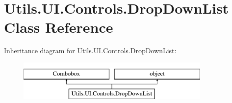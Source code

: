 \hypertarget{class_c_utils_1_1_utils_1_1_u_i_1_1_controls_1_1_drop_down_list}{}\section{Utils.\+U\+I.\+Controls.\+Drop\+Down\+List Class Reference}
\label{class_c_utils_1_1_utils_1_1_u_i_1_1_controls_1_1_drop_down_list}
Inheritance diagram for Utils.\+U\+I.\+Controls.\+Drop\+Down\+List\+:\begin{figure}[H]
\begin{center}
\leavevmode
\includegraphics[height=2.000000cm]{class_c_utils_1_1_utils_1_1_u_i_1_1_controls_1_1_drop_down_list}
\end{center}
\end{figure}
